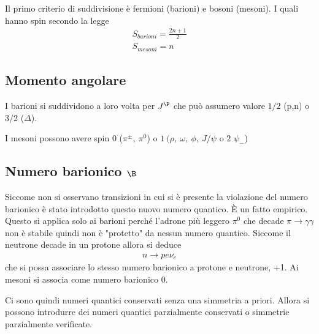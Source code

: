 \documentclass[12pt]{book}
\begin{document}
Il primo criterio di suddivisione è fermioni (barioni) e bosoni (mesoni). I quali hanno spin secondo la legge
\begin{gather}
	S_{barioni} = \frac{2n+1}{2}\\
	S_{mesoni} = n
\end{gather}

\subsection{Momento angolare}
I barioni si suddividono a loro volta per $J^\P$ che può assumero valore $1/2$ (p,n) o $3/2$ ($\Delta$).

I mesoni possono avere spin $0$ ($\pi^\pm, \ \pi^0$) o $1 \ (\rho, \ \omega, \ \phi , \ J/ \psi$ o $2$ $\psi_-$)

\subsection{Numero barionico $\B$}
Siccome non si osservano transizioni in cui si è presente la violazione del numero barionico è stato introdotto questo nuovo numero quantico. È un fatto empirico. Questo si applica solo ai barioni perché l'adrone più leggero $\pi^0$ che decade $\pi \rightarrow \gamma \gamma$ non è stabile quindi non è "protetto" da nessun numero quantico. Siccome il neutrone decade in un protone allora si deduce 
\begin{gather}
	n \rightarrow p e \nu_e
\end{gather}
che si possa associare lo stesso numero barionico a protone e neutrone, +1. Ai mesoni si associa come numero barionico 0.


Ci sono quindi numeri quantici conservati senza una simmetria a priori. Allora si possono introdurre dei numeri quantici parzialmente conservati o simmetrie parzialmente verificate.
\end{document}
